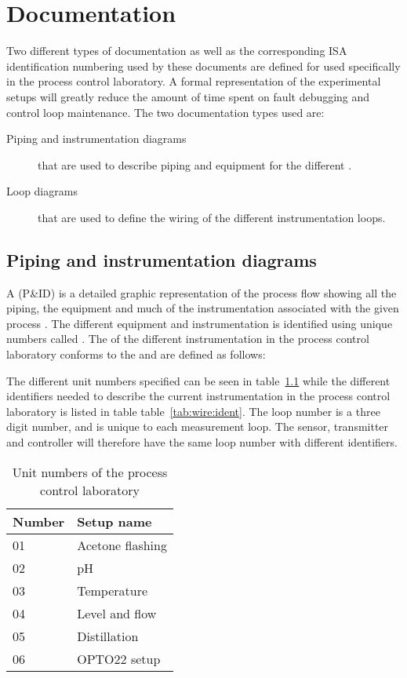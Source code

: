 \chapter{Documentation}
\begin{overview}
Two different types of documentation as well as the corresponding ISA identification numbering used by these documents are defined for used specifically in the process control laboratory. A formal representation of the experimental setups will greatly reduce the amount of time spent on fault debugging and control loop maintenance. The two documentation types used are:
\begin{description}
	\item[Piping and instrumentation diagrams] that are used to describe piping and equipment for the different .
	\item[Loop diagrams] that are used to define the wiring of the different instrumentation loops.
\end{description} 
\end{overview}

\section{Piping and instrumentation diagrams}
A  (P\&ID) is a detailed graphic representation of the process flow showing all the piping, the equipment and much of the instrumentation associated with the given process \citep[93]{Mulley93}. The different equipment and instrumentation is identified using unique numbers called . The  of the different instrumentation in the process control laboratory conforms to the  and are defined as follows:
\begin{center}
	  
\end{center}

The different unit numbers specified can be seen in table~\ref{tab:wire:units} while the different identifiers needed to describe the current instrumentation in the process control laboratory is listed in table table~\ref{tab:wire:ident}. The loop number is a three digit number, and is unique to each measurement loop. The sensor, transmitter and controller will therefore have the same loop number with different identifiers.
\begin{table}[htbp]
	\centering
	\caption{Unit numbers of the process control laboratory}
\begin{tabular}{ll}
\toprule[1pt]
	Number & 	Setup name \\
\midrule[0.5pt]
	01 & Acetone flashing \\
	02 & pH \\
	03 & Temperature \\
	04 & Level and flow \\
	05 & Distillation \\
	06 & OPTO22 setup \\
\bottomrule[1pt]
	\end{tabular}
	\label{tab:wire:units}
\end{table}

